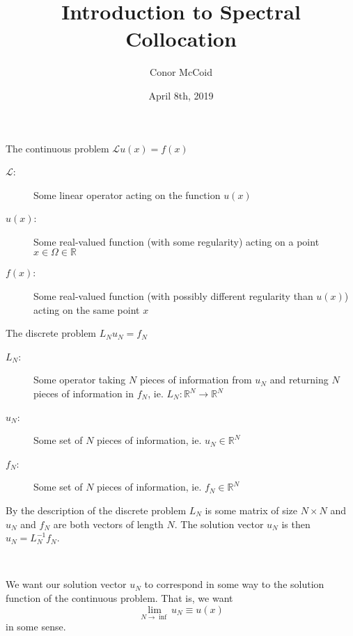 \documentclass{beamer}
\title{Introduction to Spectral Collocation}
\author{Conor McCoid}
\institute{University of Geneva}
\date{April 8th, 2019}
\begin{document}
\frame{\titlepage}

\begin{frame}

\begin{block}{The continuous problem}
$\mathcal{L} u(x) = f(x)$
\end{block}

\begin{description}
\item[$\mathcal{L}$:] Some linear operator acting on the function $u(x)$
\item[$u(x)$:] Some real-valued function (with some regularity) acting on a point $x \in \Omega \in \mathbb{R}$
\item[$f(x)$:] Some real-valued function (with possibly different regularity than $u(x)$) acting on the same point $x$
\end{description}

\end{frame}

\begin{frame}

\begin{block}{The discrete problem}
$L_N u_N = f_N$
\end{block}

\begin{description}
\item[$L_N$:] Some operator taking $N$ pieces of information from $u_N$ and returning $N$ pieces of information in $f_N$, ie. $L_N : \mathbb{R}^N \rightarrow \mathbb{R}^N$
\item[$u_N$:] Some set of $N$ pieces of information, ie. $u_N \in \mathbb{R}^N$
\item[$f_N$:] Some set of $N$ pieces of information, ie. $f_N \in \mathbb{R}^N$
\end{description}

\end{frame}

\begin{frame}

By the description of the discrete problem $L_N$ is some matrix of size $N \times N$ and $u_N$ and $f_N$ are both vectors of length $N$.
The solution vector $u_N$ is then $u_N = L_N^{-1} f_N$.

~

We want our solution vector $u_N$ to correspond in some way to the solution function of the continuous problem.
That is, we want
\begin{equation*}
\lim_{N \to \inf} u_N \equiv u(x)
\end{equation*}
in some sense.

\end{frame}
\end{document}

